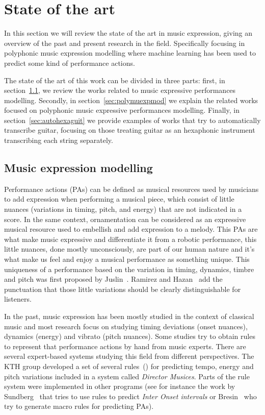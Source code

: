 \normallinespacing
\chapter{State of the art}
\label{chap:sota}
In this section we will review the state of the art in music expression, giving an
overview of the past and present research in the field. Specifically focusing in polyphonic music expression modelling where machine learning has been used to predict some kind of performance actions.

The state of the art of this work can be divided in three parts: first, in section~\ref{sec:muexpmod}, we review the works related to music expressive performances modelling. Secondly, in section~\ref{sec:polymuexpmod} we explain the related works focused on polyphonic music expressive performances modelling. Finally, in section~\ref{sec:autohexaguit} we provide examples of works that try to automatically transcribe guitar, focusing on those treating guitar as an hexaphonic instrument transcribing each string separately. 

\section{Music expression modelling}
\label{sec:muexpmod}

Performance actions (PAs) can be defined as musical resources used by musicians to add expression when performing a musical piece, which consist of little nuances (variations in timing, pitch, and energy) that are not indicated in a score. In the same context, ornamentation can be considered as an expressive musical resource used to embellish and add expression to a melody. This PAs are what make music expressive and differentiate it from a robotic performance, this little nuances, done mostly unconsciously, are part of our human nature and it's what make us feel and enjoy a musical performance as something unique. This uniqueness of a performance based on the variation in timing, dynamics, timbre and pitch was first proposed by Juslin~\cite{Juslin2001}. Ramirez and Hazan~\cite{Ramirez2006} add the punctuation that those little variations should be clearly distinguishable for listeners.

In the past, music expression has been mostly studied in the context of classical music and most research focus on studying timing deviations (onset nuances), dynamics (energy) and vibrato (pitch nuances). Some studies try to obtain rules to represent that performance actions by hand from music experts. There are several expert-based systems studying this field from different perspectives. The KTH group developed a set of several rules~(\cite{Friberg2009}) for predicting tempo, energy and pitch variations included in a system called \textit{Director Musices}. Parts of the rule system were implemented in other programs (see for instance the work by Sundberg~\cite{Sundberg2003} that tries to use rules to predict \textit{Inter Onset intervals} or Bresin~\cite{Bresin2000} who try to generate macro rules for predicting PAs).

